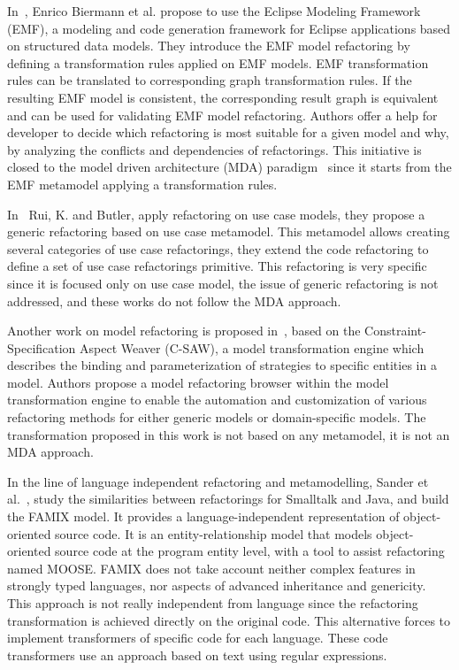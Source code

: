



In~\cite{4440135}, Enrico Biermann et al. propose to use the Eclipse Modeling Framework (EMF), a modeling and code generation framework for Eclipse applications based on structured data models. They introduce the EMF model refactoring by defining a transformation rules applied on EMF models. EMF transformation rules can be translated to corresponding graph transformation rules. If the resulting EMF model is consistent, the corresponding result graph is equivalent and can be used for validating EMF model refactoring. Authors offer a help for developer to decide which refactoring is most suitable for a given model and why, by analyzing the conflicts and dependencies of refactorings. This initiative is closed to the model driven architecture (MDA) paradigm~\cite{Kleppe:2003} since it starts from the EMF metamodel applying a transformation rules.

In~\cite{Rui:2003} Rui, K. and Butler, apply refactoring on use case models, they propose a generic refactoring based on use case metamodel. This metamodel allows creating several categories of use case refactorings, they extend the code refactoring to define a set of use case refactorings primitive. This refactoring is very specific since it is focused only on use case model, the issue of generic refactoring is not addressed, and these works do not follow the MDA approach.

Another work on model refactoring is proposed in~\cite{Zhang05genericand}, based on the Constraint-Specification Aspect Weaver (C-SAW), a model transformation engine which describes the binding and parameterization of strategies to specific entities in a model. Authors propose a model refactoring browser within the model transformation engine to enable the automation and customization of various refactoring methods for either generic models or domain-specific models. The transformation proposed in this work is not based on any metamodel, it is not an MDA approach.


In the line of language independent refactoring and metamodelling, Sander et al.~\cite{Tichelaar00}, study the similarities between refactorings for Smalltalk and Java, and build the FAMIX model. It provides a language-independent representation of object- oriented source code. It is an entity-relationship model that models object-oriented source code at the program entity level, with a tool to assist refactoring named MOOSE. FAMIX does not take account neither complex features in strongly typed languages, nor aspects of advanced inheritance and genericity. This approach is not really independent from language since the refactoring transformation is achieved directly on the original code. This alternative forces to implement transformers of specific code for each language. These code transformers use an approach based on text using regular expressions.



